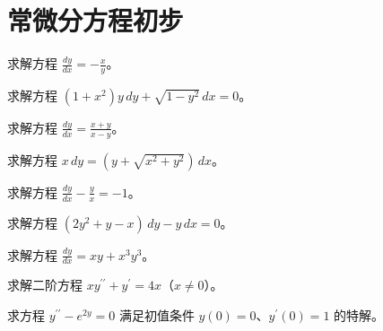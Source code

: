 \renewcommand{\thesection}{\arabic{section}}\renewcommand{\theHsection}{chapter.\arabic{section}}\setcounter{section}{5}\section{常微分方程初步}
\noindent\begin{minipage}{\textwidth}
求解方程 $\displaystyle\frac{dy}{dx}=-\frac{x}{y}$。
\end{minipage}\par\vfill
\noindent\begin{minipage}{\textwidth}
求解方程 $(1+x^2)y\,dy+\sqrt{1-y^2}\,dx=0$。
\end{minipage}\par\vfill
\noindent\begin{minipage}{\textwidth}
求解方程 $\displaystyle\frac{dy}{dx}=\frac{x+y}{x-y}$。
\end{minipage}\par\vfill
\noindent\begin{minipage}{\textwidth}
求解方程 $x\,dy=(y+\sqrt{x^2+y^2})\,dx$。
\end{minipage}\par\vfill
\newpage
\noindent\begin{minipage}{\textwidth}
求解方程 $\displaystyle\frac{dy}{dx}-\frac{y}{x}=-1$。
\end{minipage}\par\vfill
\noindent\begin{minipage}{\textwidth}
求解方程 $(2y^2+y-x)\,dy-y\,dx=0$。
\end{minipage}\par\vfill
\noindent\begin{minipage}{\textwidth}
求解方程 $\displaystyle\frac{dy}{dx}=xy+x^3y^3$。
\end{minipage}\par\vfill
\noindent\begin{minipage}{\textwidth}
求解二阶方程 $xy^{\prime\prime}+y^{\prime}=4x$（$x\ne0$）。
\end{minipage}\par\vfill
\newpage
\noindent\begin{minipage}{\textwidth}
求方程 $y^{\prime\prime}-e^{2y}=0$ 满足初值条件 $y(0)=0$、$y^{\prime}(0)=1$ 的特解。
\end{minipage}\par\vfill
